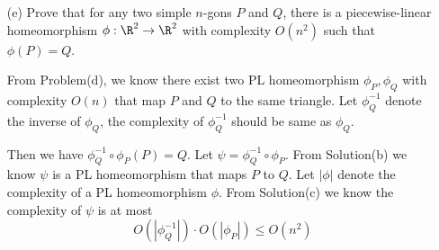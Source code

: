 \documentclass[11pt]{article}
\begin{document}
\begin{enumerate}[(a)]
  \item[(e)]
    Prove that for any two simple \(n\)-gons \(P\) and \(Q\), there is a piecewise-linear
    homeomorphism \(\phi : \R^2 \to \R^2\) with complexity \(O(n^2)\) such that \(\phi(P) = Q\).

\begin{solution}
  From Problem(d), we know there exist two PL homeomorphism \(\phi_P,\phi_Q\) with complexity \(O(n)\) that map \(P\) and \(Q\) to the same triangle.
  Let \(\phi^{-1}_Q\) denote the inverse of \(\phi_Q\), the complexity of \(\phi^{-1}_Q\) should be same as \(\phi_Q\).

  Then we have \(\phi^{-1}_Q\circ\phi_P(P)=Q\).
  Let \(\psi=\phi^{-1}_Q\circ \phi_P\).
  From Solution(b) we know \(\psi\) is a PL homeomorphism that maps \(P\) to \(Q\).
  Let \(|\phi|\) denote the complexity of a PL homeomorphism \(\phi\).
  From Solution(c) we know the complexity of \(\psi\) is at most
  \[O(|\phi^{-1}_Q|)\cdot O(|\phi_P|)\le O(n^2)\]


\end{solution}
\end{enumerate}
\end{document}
